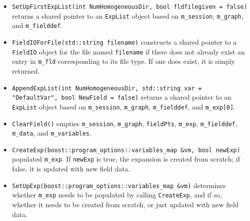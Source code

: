 \begin{itemize}

\item \verb+SetUpFirstExpList(int NumHomogeneousDir, bool fldfilegiven = false)+ returns a shared pointer to an \verb+ExpList+ object based on \verb+m_session+, \verb+m_graph+, and \verb+m_fielddef+.


\item \verb+FieldIOForFile(std::string filename)+ constructs a shared pointer to a \verb+FieldIO+ object for the file named \verb+filename+ if there does not already exist an entry in \verb+m_fld+ corresponding to its file type. If one does exist, it is simply returned.

\item \verb+AppendExpList(int NumHomogeneousDir, std::string var = "DefaultVar", bool NewField = false)+ returns a shared pointer to an \verb+ExpList+ object based on \verb+m_session+, \verb+m_graph+, \verb+m_fielddef+, and \verb+m_exp[0]+.

\item \verb+ClearField()+ empties \verb+m_session+, \verb+m_graph+, \verb+fieldPts+, \verb+m_exp+, \verb+m_fielddef+, \verb+m_data+, and \verb+m_variables+.

\item \verb+CreateExp(boost::program_options::variables_map &vm, bool newExp)+ populated \verb+m_exp+. If \verb+newExp+ is true, the expansion is created from scratch; if false, it is updated with new field data. 

\item \verb+SetUpExp(boost::program_options::variables_map &vm)+ determines whether \verb+m_exp+ needs to be populated by calling \verb+CreateExp+, and if so, whether it needs to be created from scratch, or just updated with new field data.


\end{itemize}


